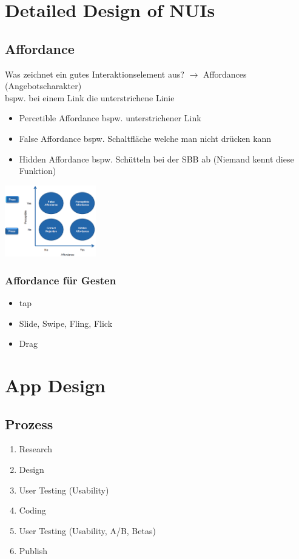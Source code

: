 \documentclass{report}
\newenvironment{Figure}
	{\par\medskip\noindent\minipage{\linewidth}}
	{\endminipage\par\medskip}
\theoremstyle{definition}
\theoremstyle{example}
\begin{document}
\chapter{Detailed Design of NUIs}

\section{Affordance}
Was zeichnet ein gutes Interaktionselement aus? $\rightarrow$ Affordances (Angebotscharakter)\\
bspw. bei einem Link die unterstrichene Linie\\
\begin{itemize}
   \item Percetible Affordance
   \subitem bspw. unterstrichener Link 
   \item False Affordance
   \subitem bspw. Schaltfläche welche man nicht drücken kann 
   \item Hidden Affordance
   \subitem bspw. Schütteln bei der SBB ab (Niemand kennt diese Funktion)
\end{itemize}

\begin{Figure}
   \centering
    \includegraphics[width=150px]{img/Affordance.png}
        \label{fig:Affordance Eingliederung}
\end{Figure}

\subsection{Affordance für Gesten}
\begin{itemize}
   \item tap
   \item Slide, Swipe, Fling, Flick
   \item Drag
\end{itemize}

\chapter{App Design}

\section{Prozess}
\begin{enumerate}
   \item Research
   \item Design
   \item User Testing (Usability)
   \item Coding
   \item User Testing (Usability, A/B, Betas)
   \item Publish
\end{enumerate}
\end{document}
